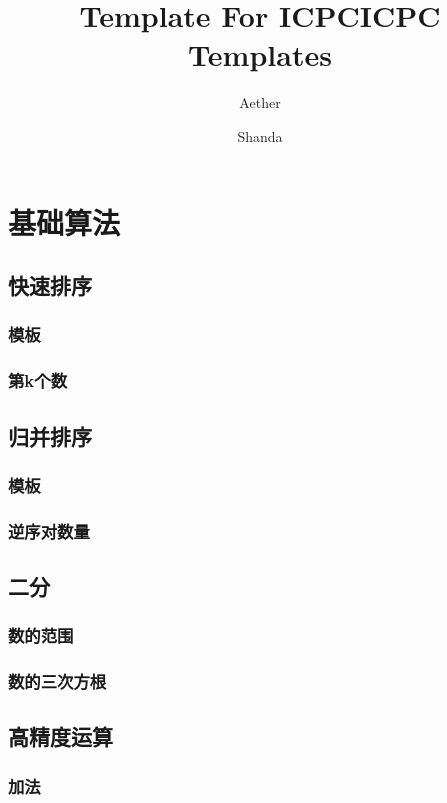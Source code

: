 \documentclass[10pt,a4paper]{article}
\title{Template For ICPC}
\author{Aether}
\begin{document}
\title{ICPC Templates}
\author {Shanda}
\maketitle
\tableofcontents
\newpage
\section{基础算法}
\subsection{快速排序}
\subsubsection{模板}

\subsubsection{第k个数}

\subsection{归并排序}
\subsubsection{模板}

\subsubsection{逆序对数量}

\subsection{二分}
\subsubsection{数的范围}

\subsubsection{数的三次方根}

\subsection{高精度运算}
\subsubsection{加法}

\end{document}
